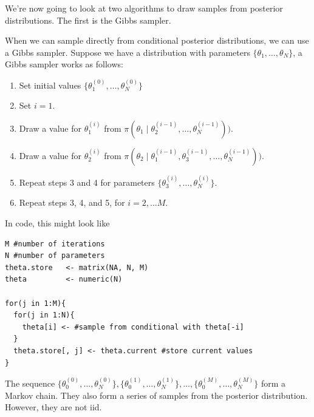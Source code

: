 \documentclass[
]{book}
\theoremstyle{definition}
\theoremstyle{definition}
\theoremstyle{definition}
\theoremstyle{definition}
\theoremstyle{remark}
\begin{document}
We're now going to look at two algorithms to draw samples from posterior distributions. The first is the Gibbs sampler.

When we can sample directly from conditional posterior distributions, we can use a Gibbs sampler. Suppose we have a distribution with parameters \(\{\theta_1, \ldots, \theta_N\}\), a Gibbs sampler works as follows:

\begin{enumerate}
\def\labelenumi{\arabic{enumi}.}
\item
  Set initial values \(\{\theta_1^{(0)}, \ldots, \theta_N^{(0)}\}\)
\item
  Set \(i = 1\).
\item
  Draw a value for \(\theta_1^{(i)}\) from \(\pi(\theta_1 \mid \theta_2^{(i-1)}, \ldots, \theta_N^{(i-1)}))\).
\item
  Draw a value for \(\theta_2^{(i)}\) from \(\pi(\theta_2 \mid \theta_1^{(i-1)}, \theta_3^{(i-1)}, \ldots, \theta_N^{(i-1)}))\).
\item
  Repeat steps 3 and 4 for parameters \(\{\theta_3^{(i)}, \ldots, \theta_N^{(i)}\}\).
\item
  Repeat steps 3, 4, and 5, for \(i = 2, \ldots M\).
\end{enumerate}

In code, this might look like

\begin{verbatim}
M #number of iterations
N #number of parameters
theta.store   <- matrix(NA, N, M)
theta         <- numeric(N)

for(j in 1:M){
  for(j in 1:N){
    theta[i] <- #sample from conditional with theta[-i]
  }
  theta.store[, j] <- theta.current #store current values
}
\end{verbatim}

The sequence \(\{\theta_0^{(0)},\ldots, \theta_N^{(0)}\}, \{\theta_0^{(1)},\ldots, \theta_N^{(1)}\}, \ldots, \{\theta_0^{(M)},\ldots, \theta_N^{(M)}\}\) form a Markov chain. They also form a series of samples from the posterior distribution. However, they are not iid.
\end{document}
